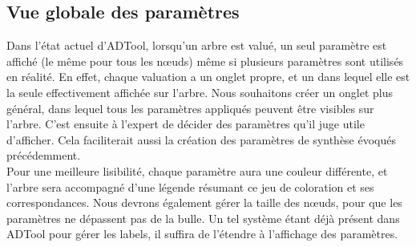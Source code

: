 	\subsection{Vue globale des paramètres}
	
	Dans l'état actuel d'ADTool, lorsqu'un arbre est valué, un seul paramètre est affiché (le même pour tous les nœuds) même si plusieurs paramètres sont utilisés en réalité. En effet, chaque valuation a un onglet propre, et un dans lequel elle est la seule effectivement affichée sur l'arbre. Nous souhaitons créer un onglet plus général, dans lequel tous les paramètres appliqués peuvent être visibles sur l'arbre. C'est ensuite à l'expert de décider des paramètres qu'il juge utile d'afficher. Cela faciliterait aussi la création des paramètres de synthèse évoqués précédemment.\\
	
	Pour une meilleure lisibilité, chaque paramètre aura une couleur différente, et l'arbre sera accompagné d'une légende résumant ce jeu de coloration et ses correspondances. Nous devrons également gérer la taille des nœuds, pour que les paramètres ne dépassent pas de la bulle. Un tel système étant déjà présent dans ADTool pour gérer les labels, il suffira de l'étendre à l'affichage des paramètres.
